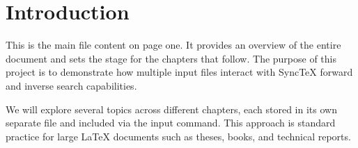 \documentclass[12pt]{article}
\begin{document}
\section{Introduction}

This is the main file content on page one. It provides an overview of the entire
document and sets the stage for the chapters that follow. The purpose of this
project is to demonstrate how multiple input files interact with SyncTeX
forward and inverse search capabilities.

We will explore several topics across different chapters, each stored in its
own separate file and included via the input command. This approach is standard
practice for large LaTeX documents such as theses, books, and technical reports.



\newpage



\newpage


\end{document}

